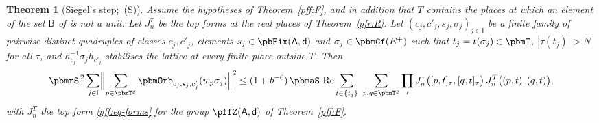 \documentclass[10pt]{amsart}
\newtheorem{theorem}{Theorem}[section]
\theoremstyle{definition}
\theoremstyle{remark}
\newcommand{\Rel}{\operatorname{Re}}
\begin{document}
\begin{theorem}[Siegel's step; {\cite[Theorem~3.51]{P51}}\,\textup{(S)}]\label{pff:S}
Assume the hypotheses of Theorem~\ref{pff:F}, and in addition that $T$ contains the places at which
an element of the set $\mathsf B$ of {\cite[\S3.3.2]{P51}} is not a unit. Let $J^\tau_n$ be the top
forms at the real places of Theorem~\ref{pfr:R}. Let $(c_j,c'_j,s_j,\sigma_j)_{j\in\mathsf I}$ be a
finite family of pairwise distinct quadruples of classes $c_j,c'_j$, elements $s_j\in\pbFix(\mathsf
A,\mathsf d)$ and $\sigma_j\in\pbmGf(E^+)$ such that $t_j=t(\sigma_j)\in\pbmT$, $|\tau(t_j)|>N$
for all $\tau$, and $h_{c_j}^{-1}\sigma_jh_{c'_j}$ stabilises the lattice at every finite place
outside $T$. Then
\[
\pbmrS^{\,2}\sum_{j\in\mathsf I}\Bigl\|\sum_{p\in\pbmT^\varrho}\pbmOrb_{c_j,s_j,c'_j}(w_p\sigma_j)
\Bigr\|^2\le(1+b^{-6})\,\pbmaS\,\Rel\sum_{t\in\{t_j\}}\ \sum_{p,q\in\pbmT^\varrho}\prod_\tau J^\tau_n
\bigl([p,t]_\tau,[q,t]_\tau\bigr)\,J^T_n\bigl((p,t),(q,t)\bigr),
\]
with $J^T_n$ the top form \eqref{pff:eq-forms} for the group $\pffZ(\mathsf A,\mathsf d)$ of
Theorem~\ref{pff:F}.
\end{theorem}
\end{document}
